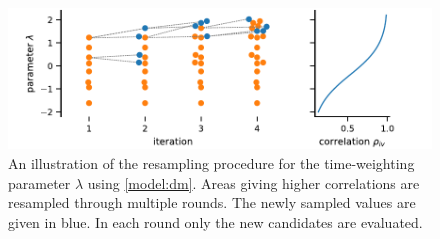 \begin{figure}
  \centering
  \includegraphics[scale=0.65]{gfx/resampling.pdf}
  \caption[Resampling algorithm]{An illustration of the resampling
    procedure for the time-weighting parameter $\lambda$ using
    \autoref{model:dm}. Areas giving higher correlations are resampled
    through multiple rounds. The newly sampled values are given in
  blue. In each round only the new candidates are evaluated.}
  \label{fig:resampling}
\end{figure}

